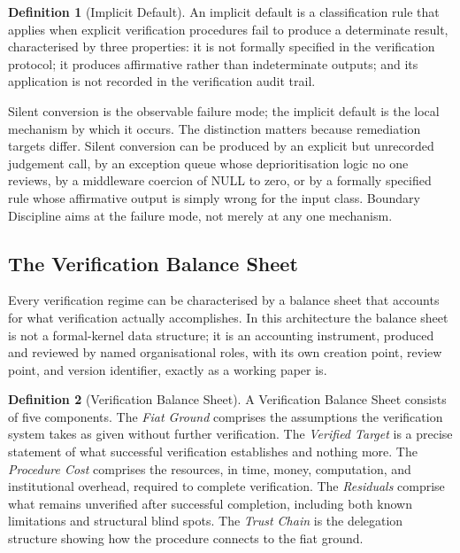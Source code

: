 \documentclass[11pt,a4paper]{article}
\theoremstyle{definition}
\newtheorem{definition}{Definition}[section]
\theoremstyle{remark}
\begin{document}
\begin{definition}[Implicit Default]
\label{def:default}
An implicit default is a classification rule that applies when explicit verification procedures fail to produce a determinate result, characterised by three properties: it is not formally specified in the verification protocol; it produces affirmative rather than indeterminate outputs; and its application is not recorded in the verification audit trail.
\end{definition}

Silent conversion is the observable failure mode; the implicit default is the local mechanism by which it occurs. The distinction matters because remediation targets differ. Silent conversion can be produced by an explicit but unrecorded judgement call, by an exception queue whose deprioritisation logic no one reviews, by a middleware coercion of \textsf{NULL} to zero, or by a formally specified rule whose affirmative output is simply wrong for the input class. Boundary Discipline aims at the failure mode, not merely at any one mechanism.

\subsection{The Verification Balance Sheet}
\label{sec:vbs}

Every verification regime can be characterised by a balance sheet that accounts for what verification actually accomplishes. In this architecture the balance sheet is not a formal-kernel data structure; it is an accounting instrument, produced and reviewed by named organisational roles, with its own creation point, review point, and version identifier, exactly as a working paper is.

\begin{definition}[Verification Balance Sheet]
\label{def:vbs}
A Verification Balance Sheet consists of five components. The \emph{Fiat Ground} comprises the assumptions the verification system takes as given without further verification. The \emph{Verified Target} is a precise statement of what successful verification establishes and nothing more. The \emph{Procedure Cost} comprises the resources, in time, money, computation, and institutional overhead, required to complete verification. The \emph{Residuals} comprise what remains unverified after successful completion, including both known limitations and structural blind spots. The \emph{Trust Chain} is the delegation structure showing how the procedure connects to the fiat ground.
\end{definition}
\end{document}
